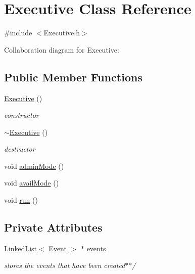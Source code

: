\hypertarget{classExecutive}{}\section{Executive Class Reference}
\label{classExecutive}


{\ttfamily \#include $<$Executive.\+h$>$}



Collaboration diagram for Executive\+:
\subsection*{Public Member Functions}
\begin{DoxyCompactItemize}
\item 
\hyperlink{classExecutive_ad870c1d741f1f313eb0c5a8336f8af6b}{Executive} ()
\begin{DoxyCompactList}\small\item\em constructor \end{DoxyCompactList}\item 
\hyperlink{classExecutive_a4ce80c499f7640b1770ade77cf56d965}{$\sim$\+Executive} ()
\begin{DoxyCompactList}\small\item\em destructor \end{DoxyCompactList}\item 
void \hyperlink{classExecutive_af662ff9fa35251d64e4fe7cdfea14baf}{admin\+Mode} ()
\item 
void \hyperlink{classExecutive_a27b17fc3144f186482f738d3d8a47f62}{avail\+Mode} ()
\item 
void \hyperlink{classExecutive_adef7cad3387e8fc79d92ffd418f45258}{run} ()
\end{DoxyCompactItemize}
\subsection*{Private Attributes}
\begin{DoxyCompactItemize}
\item 
\hyperlink{classLinkedList}{Linked\+List}$<$ \hyperlink{classEvent}{Event} $>$ $\ast$ \hyperlink{classExecutive_a96140fc69daff9ed8535b7ab42fd9db3}{events}
\begin{DoxyCompactList}\small\item\em stores the events that have been created$\ast$$\ast$/ \end{DoxyCompactList}\end{DoxyCompactItemize}


